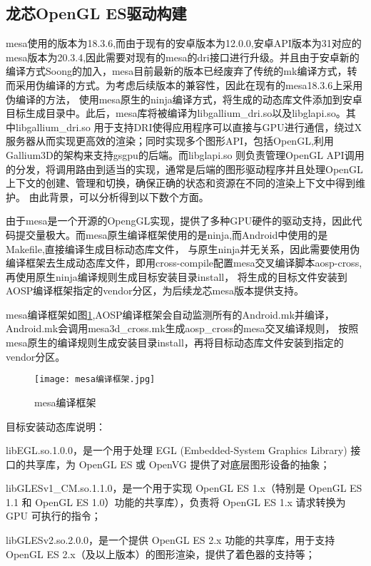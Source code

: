 \subsection{龙芯OpenGL ES驱动构建}

mesa使用的版本为18.3.6,而由于现有的安卓版本为12.0.0,安卓API版本为31对应的mesa版本为20.3.4,因此需要对现有的mesa的dri接口进行升级。并且由于安卓新的
编译方式Soong的加入，mesa目前最新的版本已经废弃了传统的mk编译方式，转而采用伪编译的方式。为考虑后续版本的兼容性，因此在现有的mesa18.3.6上采用伪编译的方法，
使用mesa原生的ninja编译方式，将生成的动态库文件添加到安卓目标生成目录中。此后，mesa库将被编译为libgallium\_dri.so以及libglapi.so。其中libgallium\_dri.so
用于支持DRI使得应用程序可以直接与GPU进行通信，绕过X服务器从而实现更高效的渲染；同时实现多个图形API，包括OpenGL,利用Gallium3D的架构来支持gsgpu的后端。而libglapi.so
则负责管理OpenGL API调用的分发，将调用路由到适当的实现，通常是后端的图形驱动程序并且处理OpenGL上下文的创建、管理和切换，确保正确的状态和资源在不同的渲染上下文中得到维护。
由此背景，可以分析得到以下数个方面。

由于mesa是一个开源的OpengGL实现，提供了多种GPU硬件的驱动支持，因此代码提交量极大。而mesa原生编译框架使用的是ninja,而Android中使用的是Makefile,直接编译生成目标动态库文件，
与原生ninja并无关系，因此需要使用伪编译框架去生成动态库文件，即用cross-compile配置mesa交叉编译脚本aosp-cross,再使用原生ninja编译规则生成目标安装目录install，
将生成的目标文件安装到AOSP编译框架指定的vendor分区，为后续龙芯mesa版本提供支持。

mesa编译框架如图\ref{fig:mesa编译框架},AOSP编译框架会自动监测所有的Android.mk并编译，Android.mk会调用mesa3d\_cross.mk生成aosp\_cross的mesa交叉编译规则，
按照mesa原生的编译规则生成安装目录install，再将目标动态库文件安装到指定的vendor分区。
\begin{figure}[h]
  \centering
  \texttt{[image: mesa编译框架.jpg]}
  \caption{mesa编译框架}
  \label{fig:mesa编译框架}
\end{figure}

目标安装动态库说明：

libEGL.so.1.0.0，是一个用于处理 EGL (Embedded-System Graphics Library) 接口的共享库，为 OpenGL ES 或 OpenVG 提供了对底层图形设备的抽象；

libGLESv1\_CM.so.1.1.0，是一个用于实现 OpenGL ES 1.x（特别是 OpenGL ES 1.1 和 OpenGL ES 1.0）功能的共享库），负责将 OpenGL ES 1.x 请求转换为 GPU 可执行的指令；

libGLESv2.so.2.0.0，是一个提供 OpenGL ES 2.x 功能的共享库，用于支持 OpenGL ES 2.x（及以上版本）的图形渲染，提供了着色器的支持等；

